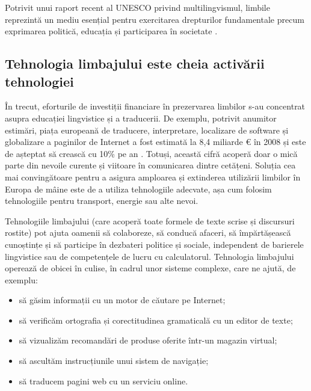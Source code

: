 \begin{multicols}{2}

Potrivit unui raport recent al UNESCO privind multilingvismul, limbile reprezintă un mediu esențial pentru exercitarea drepturilor fundamentale precum exprimarea politică, educația și participarea în societate \cite{Unesco1}.

\subsection{Tehnologia limbajului este cheia activării tehnologiei}

În trecut, eforturile de investiții financiare în prezervarea limbilor s-au concentrat asupra educației lingvistice și a traducerii. De exemplu, potrivit anumitor estimări, piața europeană de traducere, interpretare, localizare de software și globalizare a paginilor de Internet a fost estimată la 8,4 miliarde € în 2008 și este de așteptat să crească cu 10\% pe an \cite{EC3}. Totuși, această cifră acoperă doar o mică parte din nevoile curente și viitoare în comunicarea dintre cetățeni. Soluția cea mai convingătoare pentru a asigura amploarea și extinderea utilizării limbilor în Europa de mâine este de a utiliza tehnologiile adecvate, așa cum folosim tehnologiile pentru transport, energie sau alte nevoi.

Tehnologiile limbajului (care acoperă toate formele de texte scrise și discursuri rostite) pot ajuta oamenii să colaboreze, să conducă afaceri, să împărtășească cunoștințe și să participe în dezbateri politice și sociale, independent de barierele lingvistice sau de competențele de lucru cu calculatorul. Tehnologia limbajului operează de obicei în culise, în cadrul unor sisteme complexe, care ne ajută, de exemplu:

\begin{itemize}
\item să găsim informații cu un motor de căutare pe Internet;
\item să verificăm ortografia și corectitudinea gramaticală cu un editor de texte;
\item să vizualizăm recomandări de produse oferite într-un magazin virtual;
\item să ascultăm instrucțiunile unui sistem de navigație;
\item să traducem pagini web cu un serviciu online.
\end{itemize}


\end{multicols}
